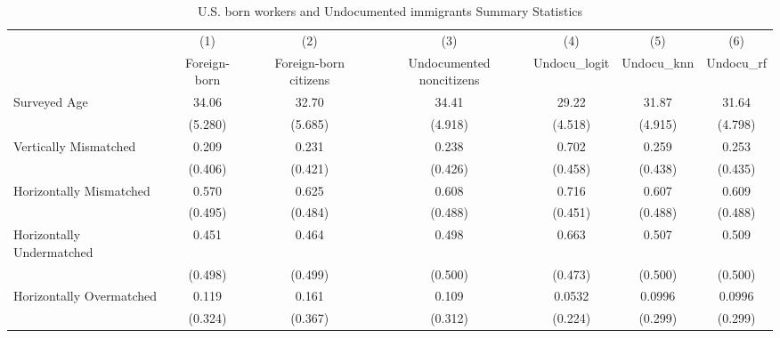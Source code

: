 \begin{table}[htbp]\centering
\def\sym#1{\ifmmode^{#1}\else\(^{#1}\)\fi}
\caption{U.S. born workers and Undocumented immigrants Summary Statistics \label{tab:sum}}
\begin{tabular}{l*{6}{c}}
\hline\hline
                    &\multicolumn{1}{c}{(1)}         &\multicolumn{1}{c}{(2)}         &\multicolumn{1}{c}{(3)}         &\multicolumn{1}{c}{(4)}         &\multicolumn{1}{c}{(5)}         &\multicolumn{1}{c}{(6)}         \\
                    &Foreign-born         &Foreign-born citizens         &Undocumented noncitizens         &Undocu\_logit         &  Undocu\_knn         &   Undocu\_rf         \\
\hline
Surveyed Age        &       34.06         &       32.70         &       34.41         &       29.22         &       31.87         &       31.64         \\
                    &     (5.280)         &     (5.685)         &     (4.918)         &     (4.518)         &     (4.915)         &     (4.798)         \\
[1em]
Vertically Mismatched&       0.209         &       0.231         &       0.238         &       0.702         &       0.259         &       0.253         \\
                    &     (0.406)         &     (0.421)         &     (0.426)         &     (0.458)         &     (0.438)         &     (0.435)         \\
[1em]
Horizontally Mismatched&       0.570         &       0.625         &       0.608         &       0.716         &       0.607         &       0.609         \\
                    &     (0.495)         &     (0.484)         &     (0.488)         &     (0.451)         &     (0.488)         &     (0.488)         \\
[1em]
Horizontally Undermatched&       0.451         &       0.464         &       0.498         &       0.663         &       0.507         &       0.509         \\
                    &     (0.498)         &     (0.499)         &     (0.500)         &     (0.473)         &     (0.500)         &     (0.500)         \\
[1em]
Horizontally Overmatched&       0.119         &       0.161         &       0.109         &      0.0532         &      0.0996         &      0.0996         \\
                    &     (0.324)         &     (0.367)         &     (0.312)         &     (0.224)         &     (0.299)         &     (0.299)         \\

\end{tabular}
\end{table}
